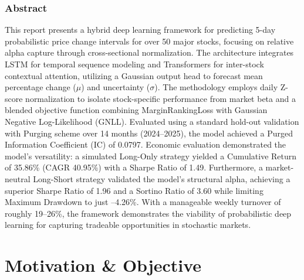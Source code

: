 \documentclass[twoside,final]{hcmut-report}
\begin{document}
\fancyfoot{}
\coverpage\clearpage

\tableofcontents\clearpage
\listoffigures\clearpage
\setcounter{page}{1}

\section*{Abstract}
This report presents a hybrid deep learning framework for predicting 5-day probabilistic price change intervals for over 50 major stocks, focusing on relative alpha capture through cross-sectional normalization. The architecture integrates LSTM for temporal sequence modeling and Transformers for inter-stock contextual attention, utilizing a Gaussian output head to forecast mean percentage change ($\mu$) and uncertainty ($\sigma$). The methodology employs daily Z-score normalization to isolate stock-specific performance from market beta and a blended objective function combining MarginRankingLoss with Gaussian Negative Log-Likelihood (GNLL). Evaluated using a standard hold-out validation with Purging scheme over 14 months (2024--2025), the model achieved a Purged Information Coefficient (IC) of 0.0797. Economic evaluation demonstrated the model's versatility: a simulated Long-Only strategy yielded a Cumulative Return of 35.86\% (CAGR 40.95\%) with a Sharpe Ratio of 1.49. Furthermore, a market-neutral Long-Short strategy validated the model's structural alpha, achieving a superior Sharpe Ratio of 1.96 and a Sortino Ratio of 3.60 while limiting Maximum Drawdown to just --4.26\%. With a manageable weekly turnover of roughly 19--26\%, the framework demonstrates the viability of probabilistic deep learning for capturing tradeable opportunities in stochastic markets.

\part{Motivation \& Objective}
\end{document}
